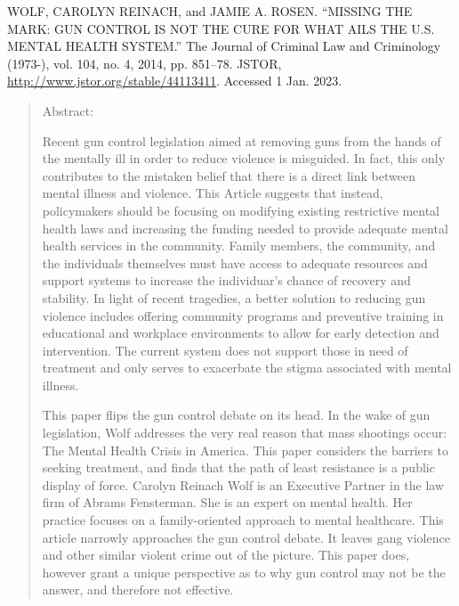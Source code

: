 \documentclass [12pt]{article}
\newcommand{\bibent}{\noindent \hangindent 40pt}
\newcommand{\bibannote}{\begin{quotation}}
\newcommand{\bibendote}{\end{quotation}}
\begin{document}
\bibent WOLF, CAROLYN REINACH, and JAMIE A. ROSEN. “MISSING THE MARK: GUN CONTROL IS NOT THE CURE FOR WHAT AILS THE U.S. MENTAL HEALTH SYSTEM.” The Journal of Criminal Law and Criminology (1973-), vol. 104, no. 4, 2014, pp. 851–78. JSTOR, \url{http://www.jstor.org/stable/44113411}. Accessed 1 Jan. 2023.
\bibannote
Abstract: \par Recent gun control legislation aimed at removing guns from the hands of the mentally ill in order to reduce violence is misguided. In fact, this only contributes to the mistaken belief that there is a direct link between mental illness and violence. This Article suggests that instead, policymakers should be focusing on modifying existing restrictive mental health laws and increasing the funding needed to provide adequate mental health services in the community. Family members, the community, and the individuals themselves must have access to adequate resources and support systems to increase the individuar's chance of recovery and stability. In light of recent tragedies, a better solution to reducing gun violence includes offering community programs and preventive training in educational and workplace environments to allow for early detection and intervention. The current system does not support those in need of treatment and only serves to exacerbate the stigma associated with mental illness. \par
This paper flips the gun control debate on its head. In the wake of gun legislation, Wolf addresses the very real reason that mass shootings occur: The Mental Health Crisis in America. This paper considers the barriers to seeking treatment, and finds that the path of least resistance is a public display of force. Carolyn Reinach Wolf is an Executive Partner in the law firm of Abrams Fensterman. She is an expert on mental health. Her practice focuses on a family-oriented approach to mental healthcare. This article narrowly approaches the gun control debate. It leaves gang violence and other similar violent crime out of the picture. This paper does, however grant a unique perspective as to why gun control may not be the answer, and therefore not effective. 
\bibendote
\end{document}
